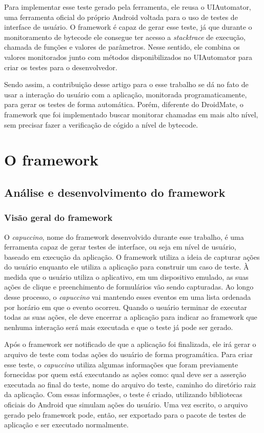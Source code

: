 \documentclass[
    12pt,       %
    openright,      %
    twoside,      %
    a4paper,      %
    english,      %
    french,       %
    spanish,      %
    brazil,       %
    ]{abntex2}
\begin{document}
      Para implementar esse teste gerado pela ferramenta, ele reusa o UIAutomator,
      uma ferramenta oficial do próprio Android voltada para o uso de testes de
      interface de usuário. O framework é capaz de gerar esse teste, já que durante
      o monitoramento de bytecode ele consegue ter acesso a \textit{stacktrace} de
      execução, chamada de funções e valores de parâmetros. Nesse sentido, ele
      combina os valores monitorados junto com métodos disponibilizados no UIAutomator
      para criar os testes para o desenvolvedor.

      Sendo assim, a contribuição desse artigo para o esse trabalho se dá no fato de usar
      a interação do usuário com a aplicação, monitorada programaticamente, para gerar
      os testes de forma automática. Porém, diferente do DroidMate, o framework que
      foi implementado buscar monitorar chamadas em mais alto nível, sem precisar fazer
      a verificação de cógido a nível de bytecode.

  \part{O framework}
    \chapter{Análise e desenvolvimento do framework}
      \section{Visão geral do framework}
        O \textit{capuccino}, nome do framework desenvolvido durante esse trabalho, é uma ferramenta
        capaz de gerar testes de interface, ou seja em nível de usuário, baseado em execução da aplicação.
        O framework utiliza a ideia de capturar ações do usuário enquanto ele utiliza a aplicação para
        construir um caso de teste. À medida que o usuário utiliza o aplicativo, em um dispositivo emulado,
        as suas ações de clique e preenchimento de formulários vão sendo capturadas. Ao longo desse processo,
        o \textit{capuccino} vai mantendo esses eventos em uma lista ordenada por horário em que o evento
        ocorreu. Quando o usuário terminar de executar todas as suas ações, ele deve encerrar a aplicação
        para indicar ao framework que nenhuma interação será mais executada e que o teste já pode ser gerado.

        Após o framework ser notificado de que a aplicação foi finalizada, ele irá gerar o arquivo de teste com
        todas ações do usuário de forma programática. Para criar esse teste, o \textit{capuccino} utiliza
        algumas informações que foram previamente fornecidas por quem está executando as ações como: qual
        deve ser a asserção executada ao final do teste, nome do arquivo do teste, caminho do diretório raiz
        da aplicação. Com essas informações, o teste é criado, utilizando bibliotecas oficiais do Android
        que simulam ações do usuário. Uma vez escrito, o arquivo gerado pelo framework pode, então, ser
        exportado para o pacote de testes de aplicação e ser executado normalmente.
\end{document}

